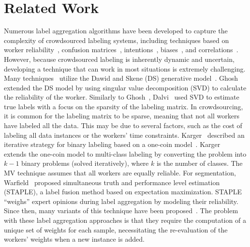 \section{Related Work}\label{sec:crowd.relatedwork}
Numerous label aggregation algorithms have been developed to capture the complexity of crowdsourced labeling systems, including techniques based on worker reliability~\cite{bi_Learning_2014,demartini_Zencrowd_2012}, confusion matrices~\cite{raykar_Learning_2010,zhang_Spectral_2014}, intentions~\cite{bi_Learning_2014,kurve_MultiCategory_2015}, biases~\cite{zhang_Imbalanced_2013,hernandez-gonzalez_Note_2019, welinder_Multidimensional_2010}, and correlations~\cite{ma_Gradient_2020}. However, because crowdsourced labeling is inherently dynamic and uncertain, developing a technique that can work in most situations is extremely challenging. Many techniques~\cite{liu_Variational_2012,karger_Budget_2014,raykar_Learning_2010,dalvi_Aggregating_2013,ghosh_Who_2011} utilize the Dawid and Skene (DS) generative model~\cite{dawid_Maximum_1979}. Ghosh~\cite{ghosh_Who_2011} extended the DS model by using singular value decomposition (SVD) to calculate the reliability of the worker. Similarly to Ghosh~\cite{ghosh_Who_2011}, Dalvi~\cite{dalvi_Aggregating_2013} used SVD to estimate true labels with a focus on the sparsity of the labeling matrix. In crowdsourcing, it is common for the labeling matrix to be sparse, meaning that not all workers have labeled all the data. This may be due to several factors, such as the cost of labeling all data instances or the workers' time constraints. Karger~\cite{karger_Budget_2014} described an iterative strategy for binary labeling based on a one-coin model~\cite{ghosh_Who_2011}. Karger~\cite{karger_Budget_2014} extends the one-coin model to multi-class labeling by converting the problem into $k-1 $ binary problems (solved iteratively), where $k $ is the number of classes.
The MV technique assumes that all workers are equally reliable. For segmentation, Warfield~\cite{warfield_Simultaneous_2004} proposed simultaneous truth and performance level estimation (STAPLE), a label fusion method based on expectation maximization. STAPLE ``weighs'' expert opinions during label aggregation by modeling their reliability. Since then, many variants of this technique have been proposed~\cite{winzeck_ISLES_2018,commowick_Objective_2018,asman_Robust_2011,asman_Formulating_2012, eugenioiglesias_Unified_2013, jorgecardoso_STEPS_2013,asman_NonLocal_2013,akhondi-asl_Logarithmic_2014}. The problem with these label aggregation approaches is that they require the computation of a unique set of weights for each sample, necessitating the re-evaluation of the workers' weights when a new instance is added.
